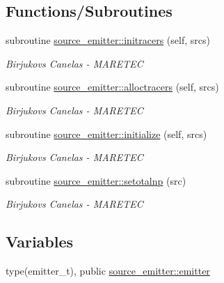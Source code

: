 \subsection*{Functions/\+Subroutines}
\begin{DoxyCompactItemize}
\item 
subroutine \mbox{\hyperlink{namespacesource__emitter_a2fb64d19c0016b31bd9dab0a13785d61}{source\+\_\+emitter\+::initracers}} (self, srcs)
\begin{DoxyCompactList}\small\item\em Birjukovs Canelas -\/ M\+A\+R\+E\+T\+EC \end{DoxyCompactList}\item 
subroutine \mbox{\hyperlink{namespacesource__emitter_a54e88b7aa868ff9de8cf018208a20585}{source\+\_\+emitter\+::alloctracers}} (self, srcs)
\begin{DoxyCompactList}\small\item\em Birjukovs Canelas -\/ M\+A\+R\+E\+T\+EC \end{DoxyCompactList}\item 
subroutine \mbox{\hyperlink{namespacesource__emitter_a6400b97541c15fcf0ec523b359aacac9}{source\+\_\+emitter\+::initialize}} (self, srcs)
\begin{DoxyCompactList}\small\item\em Birjukovs Canelas -\/ M\+A\+R\+E\+T\+EC \end{DoxyCompactList}\item 
subroutine \mbox{\hyperlink{namespacesource__emitter_a73d054a39fc1fccfde74173a5c7f2c58}{source\+\_\+emitter\+::setotalnp}} (src)
\begin{DoxyCompactList}\small\item\em Birjukovs Canelas -\/ M\+A\+R\+E\+T\+EC \end{DoxyCompactList}\end{DoxyCompactItemize}
\subsection*{Variables}
\begin{DoxyCompactItemize}
\item 
type(emitter\+\_\+t), public \mbox{\hyperlink{namespacesource__emitter_a357876a84a74e23c44e92ab8ef7dc35e}{source\+\_\+emitter\+::emitter}}
\end{DoxyCompactItemize}
